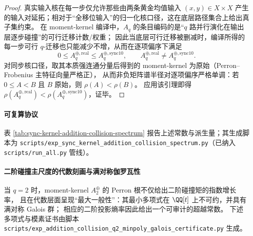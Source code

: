 \begin{proof}
真实输入核在每一步仅允许那些由两条黄金均值输入 \((x,y)\in X\times X\) 产生的输入对延拓；相对于“全移位输入”的归一化核口径，这在底层路径集合上给出真子集约束。
在 moment-kernel 编译中，\(A_q\) 的条目编码的是“\(q\) 路并行演化在输出层逐步碰撞”的可行迁移计数/权重；
因此当底层可行迁移被删减时，编译所得的每一步可行 \(q\)-迁移也只能减少不增，从而在逐项偏序下满足
\[
0\le A^{\oplus,\mathrm{real}}_q \le A^{\oplus,\mathrm{sync10}}_q,
\qquad
A^{\oplus,\mathrm{real}}_q\neq A^{\oplus,\mathrm{sync10}}_q.
\]
对同步核口径，取其本质强连通分量后得到的 moment-kernel 为原始（Perron--Frobenius 主特征向量严格正），
从而非负矩阵谱半径对逐项偏序严格单调：若 \(0\le A<B\) 且 \(B\) 原始，则 \(\rho(A)<\rho(B)\)。
应用该引理即得
\(\rho(A^{\oplus,\mathrm{real}}_q)<\rho(A^{\oplus,\mathrm{sync10}}_q)\)，证毕。
\end{proof}

\paragraph{可复算协议}
表 \ref{tab:sync-kernel-addition-collision-spectrum} 报告上述常数与派生量；其生成脚本为
\texttt{scripts/exp\_sync\_kernel\_addition\_collision\_spectrum.py}（已纳入 \texttt{scripts/run\_all.py} 管线）。


\paragraph{二阶碰撞主尺度的代数刻画与满对称伽罗瓦性}
当 \(q=2\) 时，moment-kernel \(A^{\oplus}_2\) 的 Perron 根不仅给出二阶碰撞矩的指数增长率，
且在代数层面呈现“最大一般性”：其最小多项式在 \(\QQ[t]\) 上不可约，并具有满对称 Galois 群；
相应的二阶投影熵率因此给出一个可审计的超越常数。
下述多项式与模素证书由脚本 \texttt{scripts/exp\_addition\_collision\_q2\_minpoly\_galois\_certificate.py} 生成。






